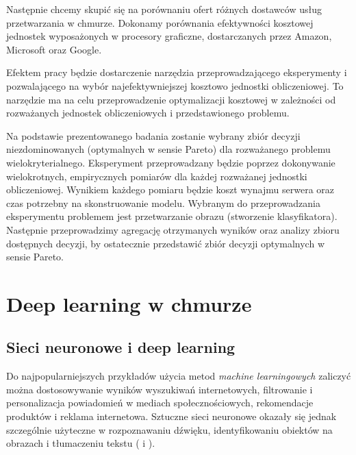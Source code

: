 \documentclass[12pt,a4paper,twoside]{article}
\begin{document}
Następnie chcemy skupić się na porównaniu ofert różnych dostawców usług przetwarzania w chmurze. Dokonamy porównania efektywności kosztowej jednostek wyposażonych w procesory graficzne, dostarczanych przez Amazon, Microsoft oraz Google.

Efektem pracy będzie dostarczenie narzędzia przeprowadzającego eksperymenty i pozwalającego na wybór najefektywniejszej kosztowo jednostki obliczeniowej. To narzędzie ma na
celu przeprowadzenie optymalizacji kosztowej w zależności od rozważanych jednostek obliczeniowych i przedstawionego problemu.

Na podstawie prezentowanego badania zostanie wybrany zbiór decyzji niezdominowanych (optymalnych w sensie Pareto) dla rozważanego problemu wielokryterialnego. Eksperyment przeprowadzany będzie poprzez dokonywanie wielokrotnych, empirycznych pomiarów dla każdej rozważanej jednostki obliczeniowej. Wynikiem każdego pomiaru będzie koszt wynajmu serwera oraz czas potrzebny na skonstruowanie modelu. Wybranym do przeprowadzania eksperymentu problemem jest przetwarzanie obrazu (stworzenie klasyfikatora). Następnie przeprowadzimy agregację otrzymanych wyników oraz analizy zbioru dostępnych decyzji, by ostatecznie przedstawić zbiór decyzji optymalnych w sensie Pareto.

\clearpage


\section{Deep learning w chmurze}
\subsection{Sieci neuronowe i deep learning}

Do najpopularniejszych przykładów użycia metod \textit{machine learningowych} zaliczyć można dostosowywanie wyników wyszukiwań internetowych, filtrowanie i personalizacja powiadomień w mediach społecznościowych, rekomendacje produktów i reklama internetowa. Sztuczne sieci neuronowe okazały się jednak szczególnie użyteczne w rozpoznawaniu dźwięku, identyfikowaniu obiektów na obrazach i tłumaczeniu tekstu (\citet{schmidhuber2015} i \citet{goodfellow2016}).
\end{document}
